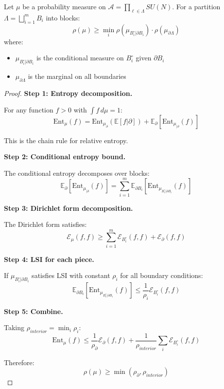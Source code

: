 \begin{lemma}
\label{lem:conditional-tensor-precise}
Let $\mu$ be a probability measure on $\mathcal{A} = \prod_{\ell \in \Lambda} SU(N)$.
For a partition $\Lambda = \bigsqcup_{i=1}^m B_i$ into blocks:
\[
\rho(\mu) \geq \min_{i} \rho(\mu_{B_i^\circ | \partial B_i}) \cdot \rho(\mu_{\partial \Lambda})
\]
where:
\begin{itemize}
\item $\mu_{B_i^\circ | \partial B_i}$ is the conditional measure on $B_i^\circ$ given $\partial B_i$
\item $\mu_{\partial \Lambda}$ is the marginal on all boundaries
\end{itemize}
\end{lemma}

\begin{proof}
\textbf{Step 1: Entropy decomposition.}

For any function $f > 0$ with $\int f \, d\mu = 1$:
\[
\mathrm{Ent}_\mu(f) = \mathrm{Ent}_{\mu_{\partial}}(\mathbb{E}[f | \partial]) + \mathbb{E}_{\partial}\left[\mathrm{Ent}_{\mu_{|\partial}}(f)\right]
\]

This is the chain rule for relative entropy.

\textbf{Step 2: Conditional entropy bound.}

The conditional entropy decomposes over blocks:
\[
\mathbb{E}_{\partial}\left[\mathrm{Ent}_{\mu_{|\partial}}(f)\right] = \sum_{i=1}^m \mathbb{E}_{\partial B_i}\left[\mathrm{Ent}_{\mu_{B_i^\circ | \partial B_i}}(f)\right]
\]

\textbf{Step 3: Dirichlet form decomposition.}

The Dirichlet form satisfies:
\[
\mathcal{E}_\mu(f, f) \geq \sum_{i=1}^m \mathcal{E}_{B_i^\circ}(f, f) + \mathcal{E}_{\partial}(f, f)
\]

\textbf{Step 4: LSI for each piece.}

If $\mu_{B_i^\circ | \partial B_i}$ satisfies LSI with constant $\rho_i$ for all boundary conditions:
\[
\mathbb{E}_{\partial B_i}\left[\mathrm{Ent}_{\mu_{B_i^\circ | \partial B_i}}(f)\right] \leq \frac{1}{\rho_i} \mathcal{E}_{B_i^\circ}(f, f)
\]

\textbf{Step 5: Combine.}

Taking $\rho_{interior} = \min_i \rho_i$:
\[
\mathrm{Ent}_\mu(f) \leq \frac{1}{\rho_{\partial}} \mathcal{E}_\partial(f,f) + \frac{1}{\rho_{interior}} \sum_i \mathcal{E}_{B_i^\circ}(f,f)
\]

Therefore:
\[
\rho(\mu) \geq \min(\rho_{\partial}, \rho_{interior})
\]
\end{proof}

